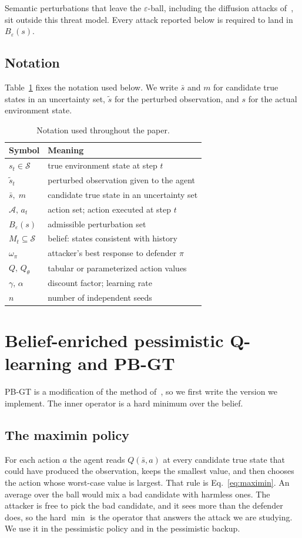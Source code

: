 \documentclass[10pt,twocolumn]{article}
\begin{document}
Semantic perturbations that leave the $\varepsilon$-ball, including the diffusion attacks of~\cite{sun2025shift}, sit outside this threat model.
Every attack reported below is required to land in $B_\varepsilon(s)$.

\subsection{Notation}
Table~\ref{tab:notation} fixes the notation used below.
We write $\bar s$ and $m$ for candidate true states in an uncertainty set, $\tilde s$ for the perturbed observation, and $s$ for the actual environment state.

\begin{table}[t]
\centering
\small
\caption{Notation used throughout the paper.}
\label{tab:notation}
\begin{tabular}{@{}ll@{}}
\toprule
Symbol & Meaning \\
\midrule
$s_t\in\mathcal{S}$ & true environment state at step $t$ \\
$\tilde s_t$ & perturbed observation given to the agent \\
$\bar s,\;m$ & candidate true state in an uncertainty set \\
$\mathcal{A},\,a_t$ & action set; action executed at step $t$ \\
$B_\varepsilon(s)$ & admissible perturbation set \\
$M_t\subseteq\mathcal{S}$ & belief: states consistent with history \\
$\omega_\pi$ & attacker's best response to defender $\pi$ \\
$Q,\,Q_\theta$ & tabular or parameterized action values \\
$\gamma,\,\alpha$ & discount factor; learning rate \\
$n$ & number of independent seeds \\
\bottomrule
\end{tabular}
\end{table}

\section{Belief-enriched pessimistic Q-learning and PB-GT}
\label{sec:pes}

PB-GT is a modification of the method of~\cite{sun2024belief}, so we first write the version we implement.
The inner operator is a hard minimum over the belief.

\subsection{The maximin policy}
For each action $a$ the agent reads $Q(\bar s,a)$ at every candidate true state that could have produced the observation, keeps the smallest value, and then chooses the action whose worst-case value is largest.
That rule is Eq.~\eqref{eq:maximin}.
An average over the ball would mix a bad candidate with harmless ones.
The attacker is free to pick the bad candidate, and it sees more than the defender does, so the hard $\min$ is the operator that answers the attack we are studying.
We use it in the pessimistic policy and in the pessimistic backup.
\end{document}

